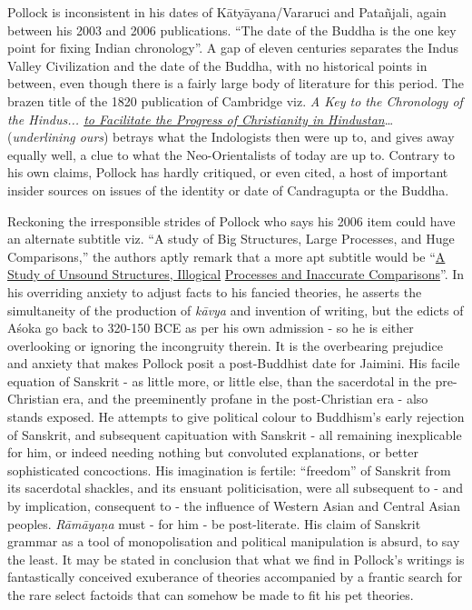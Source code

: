 Pollock is inconsistent in his dates of Kātyāyana/Vararuci and Patañjali, again between his 2003 and 2006 publications. “The date of the Buddha is the one key point for fixing Indian chronology”. A gap of eleven centuries separates the Indus Valley Civilization and the date of the Buddha, with no historical points in between, even though there is a fairly large body of literature for this period. The brazen title of the 1820 publication of Cambridge viz. \textit{A Key to the Chronology of the Hindus... \underline{to Facilitate the Progress of Christianity in Hindustan}}… (\textit{underlining ours}) betrays what the Indologists then were up to, and gives away equally well, a clue to what the Neo-Orientalists of today are up to. Contrary to his own claims, Pollock has hardly critiqued, or even cited, a host of important insider sources on issues of the identity or date of Candragupta or the Buddha.

Reckoning the irresponsible strides of Pollock who says his 2006 item could have an alternate subtitle viz. “A study of Big Structures, Large Processes, and Huge Comparisons,” the authors aptly remark that a more apt subtitle would be “\underline{A Study of Unsound Structures, Illogical} \underline{Processes and Inaccurate Comparisons}”. In his overriding anxiety to adjust facts to his fancied theories, he asserts the simultaneity of the production of \textit{kāvya} and invention of writing, but the edicts of Aśoka go back to 320-150 BCE as per his own admission - so he is either overlooking or ignoring the incongruity therein. It is the overbearing prejudice and anxiety that makes Pollock posit a post-Buddhist date for Jaimini. His facile equation of Sanskrit - as little more, or little else, than the sacerdotal in the pre-Christian era, and the preeminently profane in the post-Christian era - also stands exposed. He attempts to give political colour to Buddhism’s early rejection of Sanskrit, and subsequent capituation with Sanskrit - all remaining inexplicable for him, or indeed needing nothing but convoluted explanations, or better sophisticated concoctions. His imagination is fertile: “freedom” of Sanskrit from its sacerdotal shackles, and its ensuant politicisation, were all subsequent to - and by implication, consequent to - the influence of Western Asian and Central Asian peoples. \textit{Rāmāyaṇa} must - for him - be post-literate. His claim of Sanskrit grammar as a tool of monopolisation and political manipulation is absurd, to say the least. It may be stated in conclusion that what we find in Pollock’s writings is fantastically conceived exuberance of theories accompanied by a frantic search for the rare select factoids that can somehow be made to fit his pet theories.

